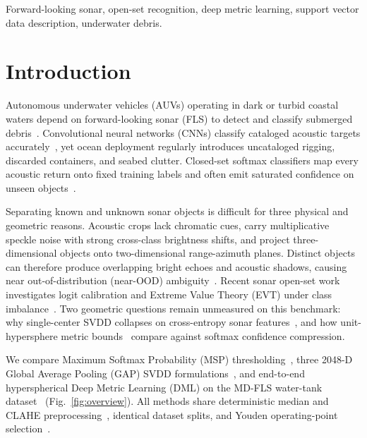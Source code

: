 \documentclass[conference]{IEEEtran}
\begin{document}
\begin{IEEEkeywords}
Forward-looking sonar, open-set recognition, deep metric learning, support vector data description, underwater debris.
\end{IEEEkeywords}

\section{Introduction}
\label{sec:intro}

Autonomous underwater vehicles (AUVs) operating in dark or turbid coastal waters depend on forward-looking sonar (FLS) to detect and classify submerged debris~\cite{valdenegro_2016_oceans,valdenegro_2017_oceans}. Convolutional neural networks (CNNs) classify cataloged acoustic targets accurately~\cite{williams_2016_icpr,valdenegro_2025_datasets}, yet ocean deployment regularly introduces uncataloged rigging, discarded containers, and seabed clutter. Closed-set softmax classifiers map every acoustic return onto fixed training labels and often emit saturated confidence on unseen objects~\cite{scheirer_2013_osr,bendale_2016_openmax}.

Separating known and unknown sonar objects is difficult for three physical and geometric reasons. Acoustic crops lack chromatic cues, carry multiplicative speckle noise with strong cross-class brightness shifts, and project three-dimensional objects onto two-dimensional range-azimuth planes. Distinct objects can therefore produce overlapping bright echoes and acoustic shadows, causing near out-of-distribution (near-OOD) ambiguity~\cite{vaze_2022_osr}. Recent sonar open-set work investigates logit calibration and Extreme Value Theory (EVT) under class imbalance~\cite{jiao_2024_sonar_osr,li_2026_copenmax}. Two geometric questions remain unmeasured on this benchmark: why single-center SVDD collapses on cross-entropy sonar features~\cite{tax_2004_svdd,chong_2020_ijcnn}, and how unit-hypersphere metric bounds~\cite{schroff_2015_facenet,musgrave_2020_pml} compare against softmax confidence compression.

We compare Maximum Softmax Probability (MSP) thresholding~\cite{hendrycks_2017_msp}, three 2048-D Global Average Pooling (GAP) SVDD formulations~\cite{scholkopf_2001_ocsvm,tax_2004_svdd}, and end-to-end hyperspherical Deep Metric Learning (DML) on the MD-FLS water-tank dataset~\cite{singh_2021_iccvw,valdenegro_2025_datasets} (Fig.~\ref{fig:overview}). All methods share deterministic median and CLAHE preprocessing~\cite{zuiderveld_1994_clahe}, identical dataset splits, and Youden operating-point selection~\cite{youden_1950_index}.
\end{document}
